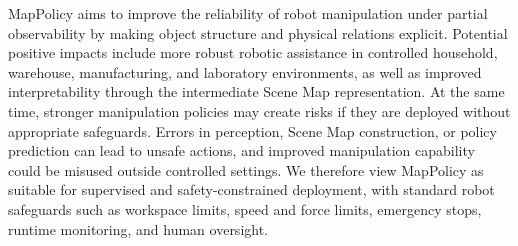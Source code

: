 MapPolicy aims to improve the reliability of robot manipulation under partial observability by making object structure and physical relations explicit. Potential positive impacts include more robust robotic assistance in controlled household, warehouse, manufacturing, and laboratory environments, as well as improved interpretability through the intermediate Scene Map representation. At the same time, stronger manipulation policies may create risks if they are deployed without appropriate safeguards. Errors in perception, Scene Map construction, or policy prediction can lead to unsafe actions, and improved manipulation capability could be misused outside controlled settings. We therefore view MapPolicy as suitable for supervised and safety-constrained deployment, with standard robot safeguards such as workspace limits, speed and force limits, emergency stops, runtime monitoring, and human oversight.


